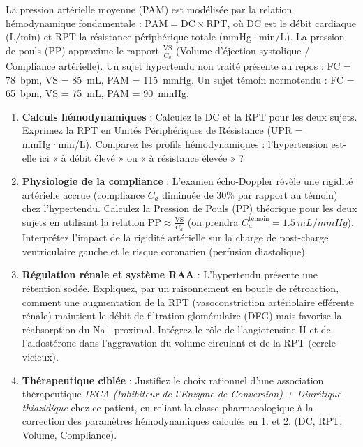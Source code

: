 \documentclass[11pt]{article}
\begin{document}
\begin{exercice}
La pression artérielle moyenne (PAM) est modélisée par la relation hémodynamique fondamentale : $\text{PAM} = \text{DC} \times \text{RPT}$, où DC est le débit cardiaque (L/min) et RPT la résistance périphérique totale (mmHg·min/L). La pression de pouls (PP) approxime le rapport $\frac{\text{VS}}{C_a}$ (Volume d'éjection systolique / Compliance artérielle).
Un sujet hypertendu non traité présente au repos : FC = \SI{78}{bpm}, VS = \SI{85}{mL}, PAM = \SI{115}{mmHg}. Un sujet témoin normotendu : FC = \SI{65}{bpm}, VS = \SI{75}{mL}, PAM = \SI{90}{mmHg}.

\begin{enumerate}
    \item \textbf{Calculs hémodynamiques} : Calculez le DC et la RPT pour les deux sujets. Exprimez la RPT en Unités Périphériques de Résistance (UPR = mmHg·min/L). Comparez les profils hémodynamiques : l'hypertension est-elle ici « à débit élevé » ou « à résistance élevée » ?
    \item \textbf{Physiologie de la compliance} : L'examen écho-Doppler révèle une rigidité artérielle accrue (compliance $C_a$ diminuée de 30\% par rapport au témoin) chez l'hypertendu. Calculez la Pression de Pouls (PP) théorique pour les deux sujets en utilisant la relation $\text{PP} \approx \frac{\text{VS}}{C_a}$ (on prendra $C_a^{\text{témoin}} = \SI{1.5}{mL/mmHg}$). Interprétez l'impact de la rigidité artérielle sur la charge de post-charge ventriculaire gauche et le risque coronarien (perfusion diastolique).
    \item \textbf{Régulation rénale et système RAA} : L'hypertendu présente une rétention sodée. Expliquez, par un raisonnement en boucle de rétroaction, comment une augmentation de la RPT (vasoconstriction artériolaire efférente rénale) maintient le débit de filtration glomérulaire (DFG) mais favorise la réabsorption du Na$^+$ proximal. Intégrez le rôle de l'angiotensine II et de l'aldostérone dans l'aggravation du volume circulant et de la RPT (cercle vicieux).
    \item \textbf{Thérapeutique ciblée} : Justifiez le choix rationnel d'une association thérapeutique \textit{IECA (Inhibiteur de l'Enzyme de Conversion) + Diurétique thiazidique} chez ce patient, en reliant la classe pharmacologique à la correction des paramètres hémodynamiques calculés en 1. et 2. (DC, RPT, Volume, Compliance).
\end{enumerate}
\end{exercice}
\end{document}
